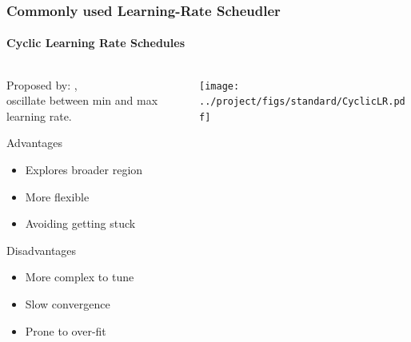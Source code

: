 \documentclass[10pt,aspectratio=169]{beamer}
\begin{document}
    \begin{frame}
        \frametitle{Commonly used Learning-Rate Scheudler}
        \framesubtitle{Cyclic Learning Rate Schedules}
        \begin{columns}
            \begin{column}{0.5\textwidth}
                Proposed by: \cite{schaul2013no}, \cite{smith2017cyclical} \\
                oscillate between min and max learning rate. \\
                \vspace{0.5cm}
                
                Advantages
                \begin{itemize}
                    \item Explores broader region
                    \item More flexible 
                    \item Avoiding getting stuck
                \end{itemize}

                Disadvantages
                \begin{itemize}
                    \item More complex to tune
                    \item Slow convergence
                    \item Prone to over-fit
                \end{itemize}
            \end{column}
            \begin{column}{0.5\textwidth}
                \texttt{[image: ../project/figs/standard/CyclicLR.pdf]}
            \end{column}
        \end{columns}
    \end{frame}
\end{document}
